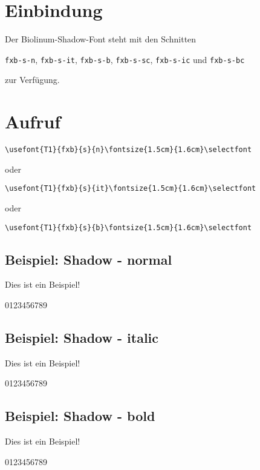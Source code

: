 \documentclass[ngerman]{libertinedoku}
\begin{document}

\section{Einbindung}

Der Biolinum-Shadow-Font steht mit den Schnitten

\texttt{fxb-s-n}, \texttt{fxb-s-it}, \texttt{fxb-s-b},
\texttt{fxb-s-sc}, \texttt{fxb-s-ic} und \texttt{fxb-s-bc}

zur Verfügung.

\section{Aufruf}

\verb|\usefont{T1}{fxb}{s}{n}\fontsize{1.5cm}{1.6cm}\selectfont|

oder

\verb|\usefont{T1}{fxb}{s}{it}\fontsize{1.5cm}{1.6cm}\selectfont|

oder

\verb|\usefont{T1}{fxb}{s}{b}\fontsize{1.5cm}{1.6cm}\selectfont|

\subsection{Beispiel: Shadow - normal}

{\fontsize{1.5cm}{1.6cm}\selectfont
Dies ist ein Beispiel!\par 0123456789\par}

\subsection{Beispiel: Shadow - italic}

{\fontsize{1.5cm}{1.6cm}\selectfont
Dies ist ein Beispiel!\par 0123456789\par}

\subsection{Beispiel: Shadow - bold}

{\fontsize{1.5cm}{1.6cm}\selectfont
Dies ist ein Beispiel!\par 0123456789\par}
\end{document}
